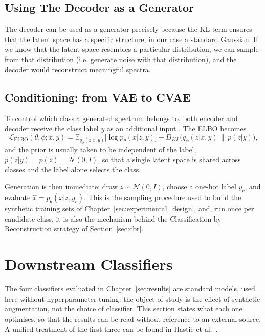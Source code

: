 \subsection*{Using The Decoder as a Generator}

The decoder can be used as a generator precisely because the KL term ensures that the latent space has a specific structure, in our case a standard Gaussian. If we know that the latent space resembles a particular distribution, we can sample from that distribution (i.e. generate noise with that distribution), and the decoder would reconstruct meaningful spectra.


\subsection*{Conditioning: from VAE to CVAE}

To control which class a generated spectrum belongs to, both encoder and decoder receive the
class label $y$ as an additional input \cite{sohn2015cvae}. The ELBO becomes
\begin{equation}
\mathcal{L}_{\text{ELBO}}(\theta,\phi;x,y)
 = \mathbb{E}_{q_\phi(z|x,y)}\big[ \log p_\theta(x|z,y) \big]
 - D_{KL}\big(q_\phi(z|x,y) \,\|\, p(z|y)\big),
\label{eq:celbo}
\end{equation}
and the prior is usually taken to be independent of the label, $p(z|y) = p(z) = \mathcal{N}(0,I)$,
so that a single latent space is shared across classes and the label alone selects the class.

Generation is then immediate: draw $z \sim \mathcal{N}(0, I)$, choose a one-hot label $y_c$,
and evaluate $\hat{x} = p_\theta(x | z, y_c)$. This is the sampling procedure used to build
the synthetic training sets of Chapter~\ref{sec:experimental_design}, and, run once per
candidate class, it is also the mechanism behind the Classification by Reconstruction strategy
of Section~\ref{sec:cbr}.


\section{Downstream Classifiers}
\label{sec:classifiers}

The four classifiers evaluated in Chapter~\ref{sec:results} are standard models, used here
without hyperparameter tuning: the object of study is the effect of synthetic augmentation,
not the choice of classifier. This section states what each one optimises, so that the results
can be read without reference to an external source. A unified treatment of the first three
can be found in Hastie et al.\ \cite{hastie2009elements}.

